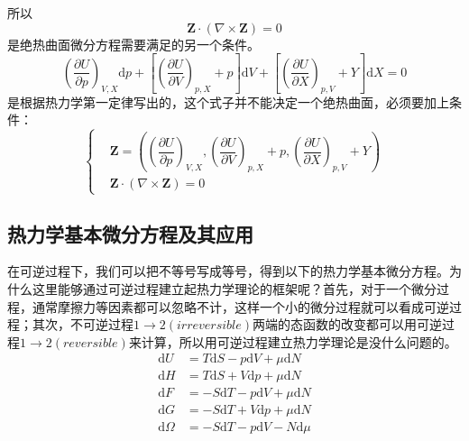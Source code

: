 \documentclass[UTF8]{ctexart}
\newcommand{\md}{\mathrm{d}}
\numberwithin{equation}{subsection}
\begin{document}
所以
\begin{equation}\label{juerequmian}
\bm{Z}\cdot(\nabla\times\bm{Z})=0
\end{equation}
是绝热曲面微分方程需要满足的另一个条件。\\
\begin{equation*}
\left(\dfrac{\partial U}{\partial p}\right)_{V,X}\md p+\left[\left(\dfrac{\partial U}{\partial V}\right)_{p,X}+p\right]\md V+\left[\left(\dfrac{\partial U}{\partial X}\right)_{p,V}+Y\right]\md X=0
\end{equation*}
是根据热力学第一定律写出的，这个式子并不能决定一个绝热曲面，必须要加上条件：
\begin{equation}
\left\{
\begin{aligned}
&\bm{Z}=\left(\left(\dfrac{\partial U}{\partial p}\right)_{V,X},\left(\dfrac{\partial U}{\partial V}\right)_{p,X}+p,\left(\dfrac{\partial U}{\partial X}\right)_{p,V}+Y\right)\\
&\bm{Z}\cdot(\nabla\times\bm{Z})=0
\end{aligned}
\right.
\end{equation}
\subsection{热力学基本微分方程及其应用}
在可逆过程下，我们可以把不等号写成等号，得到以下的热力学基本微分方程。为什么这里能够通过可逆过程建立起热力学理论的框架呢？首先，对于一个微分过程，通常摩擦力等因素都可以忽略不计，这样一个小的微分过程就可以看成可逆过程；其次，不可逆过程$1\to 2(irreversible)$两端的态函数的改变都可以用可逆过程$1\to 2(reversible)$来计算，所以用可逆过程建立热力学理论是没什么问题的。
\begin{align}
\label{eq:U}\md U&=T\md S-p\md V+\mu\md N\\
\md H&=T\md S+V\md p+\mu\md N\\
\md F&=-S\md T-p\md V+\mu\md N\\
\md G&=-S\md T+V\md p+\mu\md N\\
\md \Omega&=-S\md T-p\md V-N\md\mu\\
\end{align}
\end{document}

